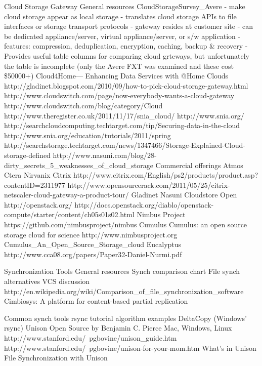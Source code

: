 	Cloud Storage Gateway
		General resources
			CloudStorageSurvey_Avere
				- make cloud storage appear as local storage
				- translates cloud storage APIs to file interfaces or storage transport protocols
				- gateway resides at customer site
					- can be dedicated appliance/server, virtual appliance/server, or s/w application
						- features: compression, deduplication, encryption, caching, backup & recovery
				- Provides useful table columns for comparing cloud grteways, but unfortunately the table is incomplete (only the Avere FXT was examined and these cost \$50000+)		
			Cloud4Home— Enhancing Data Services with @Home Clouds
			http://gladinet.blogspot.com/2010/09/how-to-pick-cloud-storage-gateway.html 
			http://www.cloudswitch.com/page/now-everybody-wants-a-cloud-gateway
			http://www.cloudswitch.com/blog/category/Cloud%
			http://www.theregister.co.uk/2011/11/17/snia_cloud/
			http://www.snia.org/
			http://searchcloudcomputing.techtarget.com/tip/Securing-data-in-the-cloud 
			http://www.snia.org/education/tutorials/2011/spring
			http://searchstorage.techtarget.com/news/1347466/Storage-Explained-Cloud-storage-defined
			http://www.nasuni.com/blog/28-dirty_secrets_5_weaknesses_of_cloud_storage 
		Commercial offerings
			Atmos 
			Ctera
			Nirvanix 
			Citrix
			http://www.citrix.com/English/ps2/products/product.asp?contentID=2311977
			http://www.opensourcerack.com/2011/05/25/citrix-netscaler-cloud-gateway-a-product-tour/
			Gladinet 
			Nasuni
			Cloudstore 
		Open
			http://openstack.org/
				http://docs.openstack.org/diablo/openstack-compute/starter/content/ch05s01s02.html 
			Nimbus Project
				https://github.com/nimbusproject/nimbus
			Cumulus
				Cumulus: an open source storage cloud for science
				http://www.nimbusproject.org	
				Cumulus_An_Open_Source_Storage_cloud
			Eucalyptus
				http://www.cca08.org/papers/Paper32-Daniel-Nurmi.pdf		

	Synchronization Tools
		General resources
			Synch comparison chart 
			File synch alternatives 
			VCS discussion
			http://en.wikipedia.org/wiki/Comparison_of_file_synchronization_software
			Cimbiosys: A platform for content-based partial replication
		
		Common synch tools
			rsync
				tutorial
				algorithm 
				examples
			DeltaCopy (Windows' rsync)		
			Unison
				Open Source by Benjamin C. Pierce 
				Mac, Windows, Linux
				http://www.stanford.edu/~pgbovine/unison_guide.htm
				http://www.stanford.edu/~pgbovine/unison-for-your-mom.htm
				What’s in Unison
				File Synchronization with Unison
				
